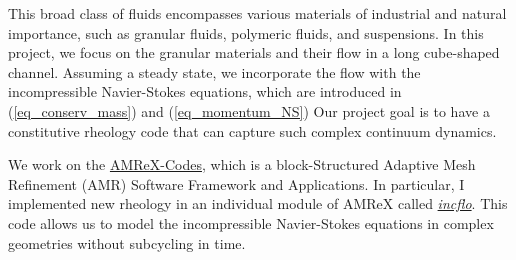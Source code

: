 \par
This broad class of fluids encompasses various materials of industrial and natural importance,
such as granular fluids, polymeric fluids, and suspensions. 
In this project, we focus on the granular materials and their flow in a long cube-shaped channel. Assuming a steady state, we incorporate the flow with the incompressible Navier-Stokes equations, which are introduced in (\ref{eq_conserv_mass}) and (\ref{eq_momentum_NS})
Our project goal is to have a constitutive rheology code that can capture such complex continuum dynamics. 
\par
We work on the \href{https://amrex-codes.github.io/index.html}{{\color{blue}AMReX-Codes}}, which is a block-Structured Adaptive Mesh Refinement (AMR) Software Framework and Applications. In particular, I implemented new rheology in an individual module of AMReX called \href{https://amrex-codes.github.io/incflo/}{{\color{blue}\textit{incflo}}}. This code allows us to model the incompressible Navier-Stokes equations in complex geometries without subcycling in time.









